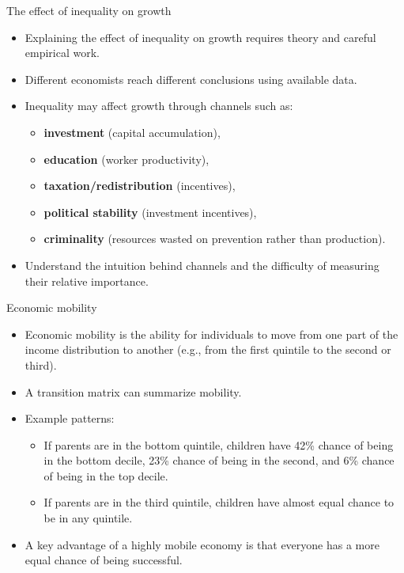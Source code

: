 \documentclass[aspectratio=169]{beamer}
\begin{document}
\begin{frame}{The effect of inequality on growth}
\transfade
\begin{itemize}[<+->]
\item Explaining the effect of inequality on growth requires theory and careful empirical work.
\item Different economists reach different conclusions using available data.
\item Inequality may affect growth through channels such as:
\begin{itemize}[<+->]
\item \textbf{investment} (capital accumulation),
\item \textbf{education} (worker productivity),
\item \textbf{taxation/redistribution} (incentives),
\item \textbf{political stability} (investment incentives),
\item \textbf{criminality} (resources wasted on prevention rather than production).
\end{itemize}
\item Understand the intuition behind channels and the difficulty of measuring their relative importance.
\end{itemize}
\end{frame}

\begin{frame}{Economic mobility}
\transfade
\begin{itemize}[<+->]
\item Economic mobility is the ability for individuals to move from one part of the income distribution to another (e.g., from the first quintile to the second or third).
\item A transition matrix can summarize mobility.
\item Example patterns:
\begin{itemize}[<+->]
\item If parents are in the bottom quintile, children have 42\% chance of being in the bottom decile, 23\% chance of being in the second, and 6\% chance of being in the top decile.
\item If parents are in the third quintile, children have almost equal chance to be in any quintile.
\end{itemize}
\item A key advantage of a highly mobile economy is that everyone has a more equal chance of being successful.
\end{itemize}
\end{frame}
\end{document}
